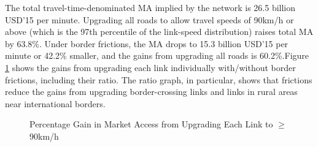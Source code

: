 \documentclass[a4paper]{article}
\begin{document}
The total travel-time-denominated MA implied by the network is 26.5 billion USD'15 per minute. Upgrading all roads to allow travel speeds of 90km/h or above (which is the 97th percentile of the link-speed distribution) raises total MA by 63.8\%. Under border frictions, the MA drops to 15.3 billion USD'15 per minute or 42.2\% smaller, and the gains from upgrading all roads is 60.2\%.\newpage Figure \ref{fig:MA_TT} shows the gains from upgrading each link individually with/without border frictions, including their ratio. The ratio graph, in particular, shows that frictions reduce the gains from upgrading border-crossing links and links in rural areas near international borders.


\begin{figure}[H]  \vspace{-3mm}
\centering
\caption{\label{fig:MA_TT} Percentage Gain in Market Access from Upgrading Each Link to $\geq$90km/h}
\vspace{2mm}
\end{figure}
\end{document}
